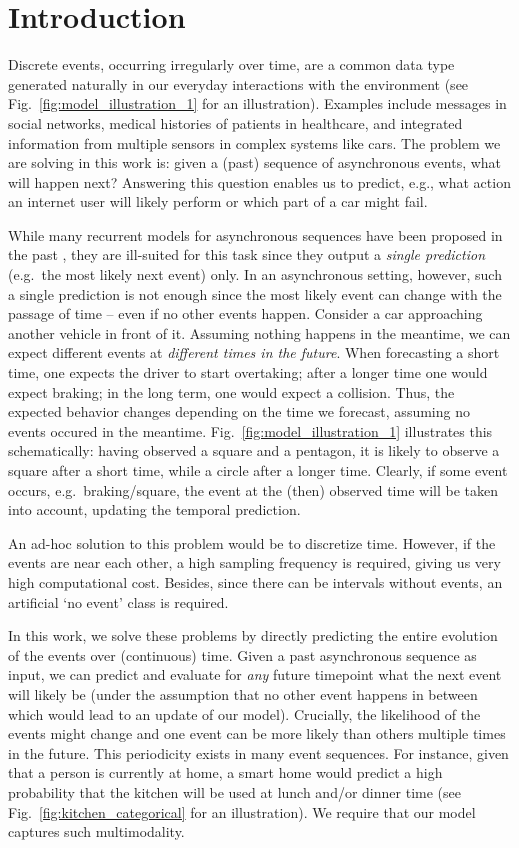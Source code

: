 \section{Introduction}\label{introduction}

Discrete events, occurring irregularly over time, are a common data type generated naturally in our everyday interactions with the environment (see Fig.~\ref{fig:model_illustration_1} for an illustration). Examples include messages in social networks, medical histories of patients in healthcare, and integrated information from multiple sensors in complex systems like cars. The problem we are solving in this work is: given a (past) sequence of asynchronous events, what will happen next? Answering this question enables us to predict, e.g., what action an internet user will likely perform or which part of a car might fail.

While many recurrent models for asynchronous sequences have been proposed in the past \cite{PhasedLstm, RMTPP}, they are ill-suited for this task since they output a \textit{single prediction} (e.g.\ the most likely next event) only. In an asynchronous setting, however, such a single prediction is not enough since the most likely event can change with the passage of time -- even if no other events happen. Consider a car approaching another vehicle in front of it. Assuming nothing happens in the meantime, we can expect different events at \textit{different times in the future}. When forecasting a short time, one expects the driver to start overtaking; after a longer time one would expect braking; in the long term, one would expect a collision. Thus, the expected behavior changes depending on the time we forecast, assuming no events occured in the meantime. Fig.\ \ref{fig:model_illustration_1} illustrates this schematically: having observed a square and a pentagon, it is likely to observe a square after a short time, while a circle after a longer time. Clearly, if some event occurs, e.g.\ braking/square, the event at the (then) observed time will be taken into account, updating the temporal prediction.

An ad-hoc solution to this problem would be to discretize time. However, if the events are near each other, a high sampling frequency is required, giving us very high computational cost. Besides, since there can be intervals without events, an artificial `no event' class is required.

In this work, we solve these problems by directly predicting the entire evolution of the events over (continuous) time. Given a past asynchronous sequence as input, we can predict and evaluate for \textit{any} future timepoint what the next event will likely be (under the assumption that no other event happens in between which would lead to an update of our model). Crucially, the likelihood of the events might change and one event can be more likely than others multiple times in the future. This periodicity exists in many event sequences. For instance, given that a person is currently at home, a smart home would predict a high probability that the kitchen will be used at lunch and/or dinner time (see Fig.\ \ref{fig:kitchen_categorical} for an illustration). We require that our model captures such multimodality.

